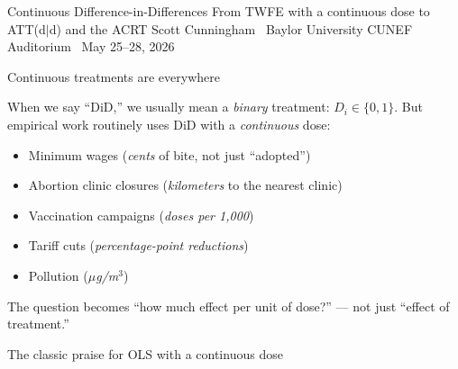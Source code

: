 \documentclass[aspectratio=169,12pt,t]{beamer}
\begin{document}

\codechellatitle
  {Continuous Difference-in-Differences}
  {From TWFE with a continuous dose to ATT(d$|$d) and the ACRT}
  {Scott Cunningham \textperiodcentered\ Baylor University}
  {CUNEF Auditorium \textperiodcentered\ May 25--28, 2026}


\begin{frame}{Continuous treatments are everywhere}
\vspace{0.2cm}

When we say ``DiD,'' we usually mean a \textit{binary} treatment: $D_i \in \{0,1\}$. \;But empirical work routinely uses DiD with a \textit{continuous} dose:

\vspace{0.4cm}
\begin{itemize}\small\setlength\itemsep{1pt}
  \item Minimum wages (\textit{cents} of bite, not just ``adopted'')
  \item Abortion clinic closures (\textit{kilometers} to the nearest clinic)
  \item Vaccination campaigns (\textit{doses per 1{,}000})
  \item Tariff cuts (\textit{percentage-point reductions})
  \item Pollution (\textit{$\mu$g/m$^3$})
\end{itemize}

\vspace{0.3cm}
 \;The question becomes ``how much effect per unit of dose?'' --- not just ``effect of treatment.''
\end{frame}

\begin{frame}{The classic praise for OLS with a continuous dose}
\vspace{0.2cm}


\vspace{0.5cm}


\vspace{0.4em}
\end{frame}
\end{document}
